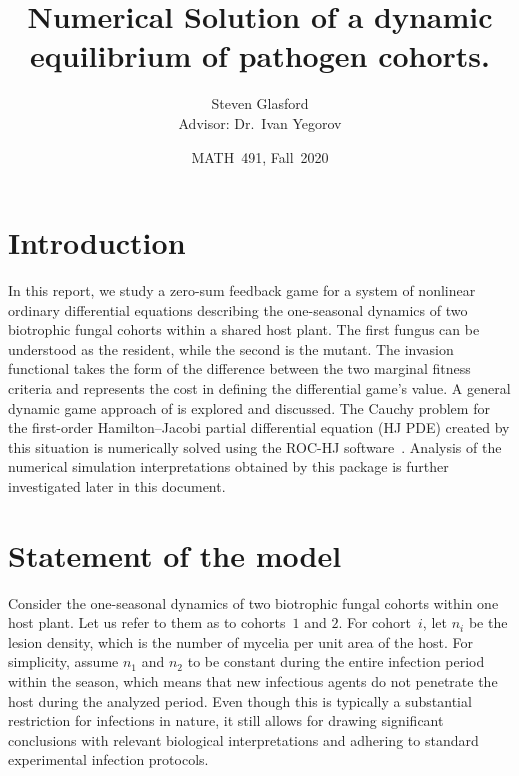 \documentclass[11pt]{amsart}
\author{Steven Glasford \\ Advisor: Dr.~Ivan Yegorov}
\title{Numerical Solution of a dynamic equilibrium of pathogen cohorts.}
\begin{document}
\date{MATH~491, Fall~2020}



\maketitle



\section{Introduction}

In this report, we study a zero-sum feedback game for a system of nonlinear ordinary differential equations describing the
one-seasonal dynamics of two biotrophic fungal cohorts within a shared host plant. The first fungus can be understood as the resident, while the second is the mutant.  
The invasion functional takes the form of the difference between the two marginal fitness criteria and represents the cost in defining the differential game's value. A general dynamic game approach
of \cite{YegorovGrognardMailleretHalkettBernhard2019} is explored and discussed. 
The Cauchy problem for the first-order Hamilton--Jacobi partial differential equation (HJ PDE) created by this situation is numerically solved using
the ROC-HJ software~\cite{ROCHJ2019}.
Analysis of the numerical simulation interpretations obtained by this package is further investigated later in this document.


\section{Statement of the model}

Consider the one-seasonal dynamics of two biotrophic fungal cohorts within one host plant. Let us refer to them as to
cohorts~$ 1 $ and $ 2 $. For cohort~$ i $, let $ n_i $ be the lesion density, which is the number of mycelia per unit area of
the host. For simplicity, assume $ n_1 $ and $ n_2 $ to be constant during the entire infection period within the season,
which means that new infectious agents do not penetrate the host during the analyzed period. Even though this is typically
a substantial restriction for infections in nature, it still allows for drawing significant conclusions with relevant biological
interpretations and adhering to standard experimental infection protocols.
\end{document}
